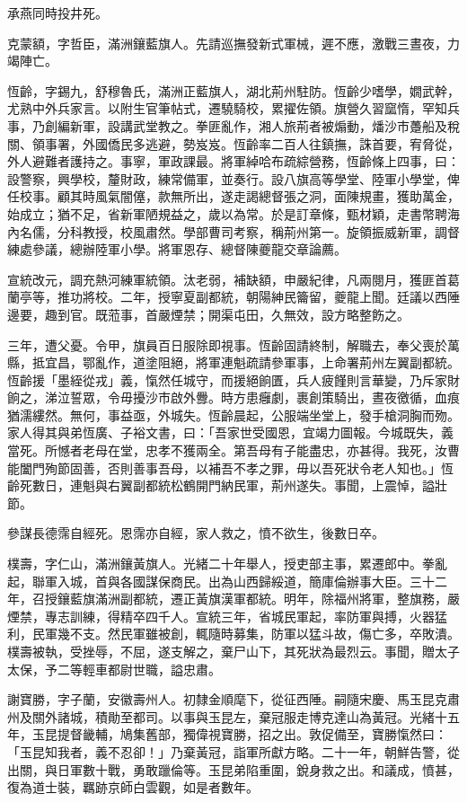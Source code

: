 \begin{pinyinscope}
承燕同時投井死。

克蒙額，字哲臣，滿洲鑲藍旗人。先請巡撫發新式軍械，遲不應，激戰三晝夜，力竭陣亡。

恆齡，字錫九，舒穆魯氏，滿洲正藍旗人，湖北荊州駐防。恆齡少嗜學，嫺武幹，尤熟中外兵家言。以附生官筆帖式，遷驍騎校，累擢佐領。旗營久習窳惰，罕知兵事，乃創編新軍，設講武堂教之。拳匪亂作，湘人旅荊者被煽動，燔沙市躉船及稅關、領事署，外國僑民多逃避，勢岌岌。恆齡率二百人往鎮撫，誅首要，宥脅從，外人避難者護持之。事寧，軍政課最。將軍綽哈布疏綜營務，恆齡條上四事，曰：設警察，興學校，釐財政，練常備軍，並奏行。設八旗高等學堂、陸軍小學堂，俾任校事。顧其時風氣闇僿，款無所出，遂走謁總督張之洞，面陳規畫，獲助萬金，始成立；猶不足，省新軍陋規益之，歲以為常。於是訂章條，甄材穎，走書幣聘海內名儒，分科教授，校風肅然。學部曹司考察，稱荊州第一。旋領振威新軍，調督練處參議，總辦陸軍小學。將軍恩存、總督陳夔龍交章論薦。

宣統改元，調充熱河練軍統領。汰老弱，補缺額，申嚴紀律，凡兩閱月，獲匪首葛蘭亭等，推功將校。二年，授寧夏副都統，朝陽紳民籥留，夔龍上聞。廷議以西陲邊要，趣到官。既蒞事，首嚴煙禁；開渠屯田，久無效，設方略整飭之。

三年，遭父憂。令甲，旗員百日服除即視事。恆齡固請終制，解職去，奉父喪於萬縣，抵宜昌，鄂亂作，道塗阻絕，將軍連魁疏請參軍事，上命署荊州左翼副都統。恆齡援「墨絰從戎」義，愾然任城守，而援絕餉匱，兵人疲饉則言華變，乃斥家財餉之，涕泣誓眾，令毋擾沙市啟外釁。時方患癰劇，裹創策騎出，晝夜徼循，血痕猶濡縷然。無何，事益亟，外城失。恆齡晨起，公服端坐堂上，發手槍洞胸而歾。家人得其與弟恆廣、子裕文書，曰：「吾家世受國恩，宜竭力圖報。今城既失，義當死。所憾者老母在堂，忠孝不獲兩全。第吾母有子能盡忠，亦甚得。我死，汝曹能闔門殉節固善，否則善事吾母，以補吾不孝之罪，毋以吾死狀令老人知也。」恆齡死數日，連魁與右翼副都統松鶴開門納民軍，荊州遂失。事聞，上震悼，謚壯節。

參謀長德霈自經死。恩霈亦自經，家人救之，憤不欲生，後數日卒。

樸壽，字仁山，滿洲鑲黃旗人。光緒二十年舉人，授吏部主事，累遷郎中。拳亂起，聯軍入城，首與各國謀保商民。出為山西歸綏道，簡庫倫辦事大臣。三十二年，召授鑲藍旗滿洲副都統，遷正黃旗漢軍都統。明年，除福州將軍，整旗務，嚴煙禁，專志訓練，得精卒四千人。宣統三年，省城民軍起，率防軍與搏，火器猛利，民軍幾不支。然民軍雖被創，輒隨時募集，防軍以猛斗故，傷亡多，卒敗潰。樸壽被執，受挫辱，不屈，遂支解之，棄尸山下，其死狀為最烈云。事聞，贈太子太保，予二等輕車都尉世職，謚忠肅。

謝寶勝，字子蘭，安徽壽州人。初隸金順麾下，從征西陲。嗣隨宋慶、馬玉昆克肅州及關外諸城，積勛至都司。以事與玉昆左，棄冠服走博克達山為黃冠。光緒十五年，玉昆提督畿輔，鳩集舊部，獨偉視寶勝，招之出。敦促備至，寶勝愾然曰：「玉昆知我者，義不忍卻！」乃棄黃冠，詣軍所獻方略。二十一年，朝鮮告警，從出關，與日軍數十戰，勇敢躐倫等。玉昆弟陷重圍，銳身救之出。和議成，憤甚，復為道士裝，羈跡京師白雲觀，如是者數年。


\end{pinyinscope}
